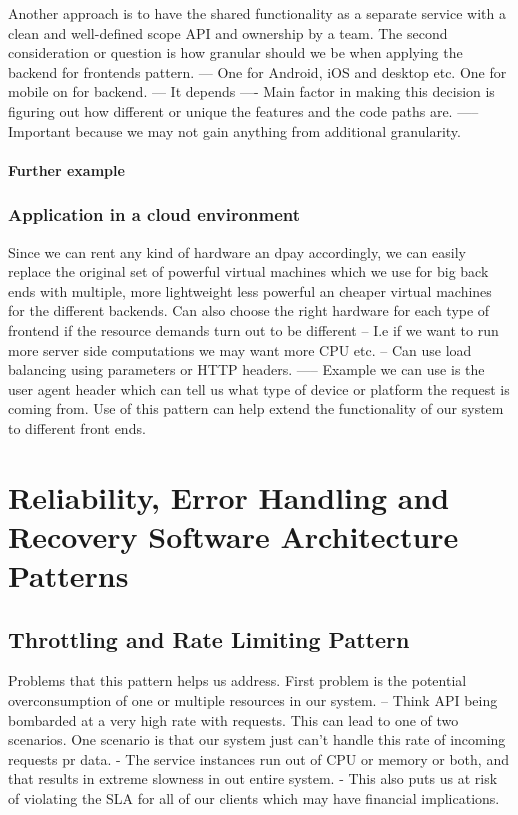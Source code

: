 \documentclass[a4paper, 11pt]{book}
\begin{document}
    Another approach is to have the shared functionality as a separate service with a clean and well-defined scope API and ownership by a team.
    The second consideration or question is how granular should we be when applying the backend for frontends pattern.
    --- One for Android, iOS and desktop etc. One for mobile on for backend.
    --- It depends
    ---- Main factor in making this decision is figuring out how different or unique the features and the code paths are.
    ----- Important because we may not gain anything from additional granularity.

    \paragraph{Further example}

    \subsubsection{Application in a cloud environment}
    Since we can rent any kind of hardware an dpay accordingly, we can easily replace the original set of powerful virtual machines which we use for big back ends with multiple, more lightweight less powerful an cheaper virtual machines for the different backends.
    Can also choose the right hardware for each type of frontend if the resource demands turn out to be different
    -- I.e if we want to run more server side computations we may want more CPU etc.
    -- Can use load balancing using parameters or HTTP headers.
    ----- Example we can use is the user agent header which can tell us what type of device or platform the request is coming from.
    Use of this pattern can help extend the functionality of our system to different front ends.

    \section{Reliability, Error Handling and Recovery Software Architecture Patterns}

    \subsection{Throttling and Rate Limiting Pattern}
    Problems that this pattern helps us address.
    First problem is the potential overconsumption of one or multiple resources in our system.
    -- Think API being bombarded at a very high rate with requests.
    This can lead to one of two scenarios.
    One scenario is that our system just can't handle this rate of incoming requests pr data.
    - The service instances run out of CPU or memory or both, and that results in extreme slowness in out entire system.
    - This also puts us at risk of violating the SLA for all of our clients which may have financial implications.
\end{document}
